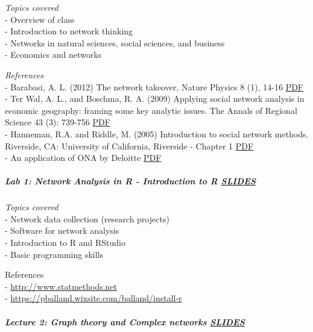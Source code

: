 \documentclass[
]{article}
\begin{document}
\emph{Topics covered}\\
- Overview of class\\
- Introduction to network thinking\\
- Networks in natural sciences, social sciences, and business\\
- Economics and networks

\emph{References}\\
- Barabasi, A. L. (2012) The network takeover, Nature Physics 8 (1),
14-16
\href{https://2c2e773f-85c0-4039-818c-ea517fc75085.filesusr.com/ugd/c5611b_c65333e3828c4a7a854f20ff09e4b127.pdf}{PDF}\\
- Ter Wal, A. L., and Boschma, R. A. (2009) Applying social network
analysis in economic geography: framing some key analytic issues. The
Annals of Regional Science 43 (3): 739-756
\href{https://2c2e773f-85c0-4039-818c-ea517fc75085.filesusr.com/ugd/c5611b_0931e6065e214ba1933018110703fae3.pdf}{PDF}\\
- Hanneman, R.A. and Riddle, M. (2005) Introduction to social network
methods. Riverside, CA: University of California, Riverside - Chapter 1
\href{http://faculty.ucr.edu/~hanneman/nettext/C1_Social_Network_Data.html}{PDF}\\
- An application of ONA by Deloitte
\href{https://www2.deloitte.com/us/en/pages/human-capital/articles/organizational-network-analysis.html}{PDF}

\hypertarget{lab-1-network-analysis-in-r---introduction-to-r-slides}{%
\subparagraph{\texorpdfstring{\textbf{Lab 1: Network Analysis in R -
Introduction to R}
\href{https://github.com/PABalland/PABalland.github.io/raw/master/teaching/on/Lab1.html}{SLIDES}}{Lab 1: Network Analysis in R - Introduction to R SLIDES}}\label{lab-1-network-analysis-in-r---introduction-to-r-slides}}

\emph{Topics covered}\\
- Network data collection (research projects)\\
- Software for network analysis\\
- Introduction to R and RStudio\\
- Basic programming skills

References\\
- \url{http://www.statmethods.net}\\
- \url{https://pballand.wixsite.com/balland/install-r}

\hypertarget{lecture-2-graph-theory-and-complex-networks-slides}{%
\subparagraph{\texorpdfstring{\textbf{Lecture 2: Graph theory and
Complex networks}
\href{https://github.com/PABalland/PABalland.github.io/raw/master/teaching/on/L2.pdf}{SLIDES}}{Lecture 2: Graph theory and Complex networks SLIDES}}\label{lecture-2-graph-theory-and-complex-networks-slides}}
\end{document}
